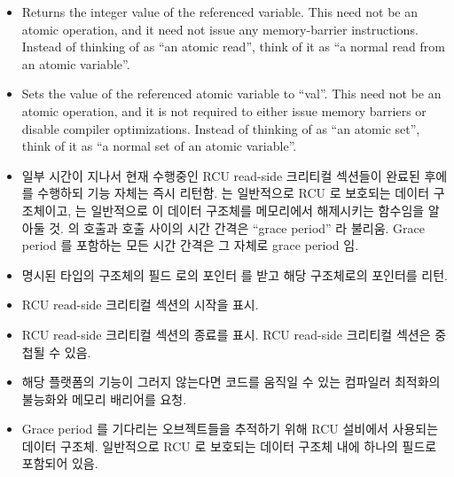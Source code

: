 \begin{itemize}
\item	{}
	Returns the integer value of the referenced variable.
	This need not be an atomic operation, and it need not issue any
	memory-barrier instructions.
	Instead of thinking of as ``an atomic read'', think of it as
	``a normal read from an atomic variable''.
\item	{}
	Sets the value of the referenced atomic variable to ``val''.
	This need not be an atomic operation, and it is not required
	to either issue memory
	barriers or disable compiler optimizations.
	Instead of thinking of as ``an atomic set'', think of it as
	``a normal set of an atomic variable''.
\fi
\item	{}
	일부 시간이 지나서 현재 수행중인 RCU read-side 크리티컬 섹션들이 완료된
	후에  를 수행하되  기능 자체는 즉시
	리턴함.
	 는 일반적으로 RCU 로 보호되는 데이터 구조체이고,  는
	일반적으로 이 데이터 구조체를 메모리에서 해제시키는 함수임을 알아둘 것.
	 의 호출과  호출 사이의 시간 간격은 ``grace
	period'' 라 불리움.
	Grace period 를 포함하는 모든 시간 간격은 그 자체로 grace period 임.
\item	{}
	명시된 타입의 구조체의 필드  로의 포인터  를 받고 해당
	구조체로의 포인터를 리턴.
\item	{}
	RCU read-side 크리티컬 섹션의 시작을 표시.
\item	{}
	RCU read-side 크리티컬 섹션의 종료를 표시.
	RCU read-side 크리티컬 섹션은 중첩될 수 있음.
\item	{}
	해당 플랫폼의  기능이 그러지 않는다면 코드를 움직일 수
	있는 컴파일러 최적화의 불능화와 메모리 배리어를 요청.
\item	{}
	Grace period 를 기다리는 오브젝트들을 추적하기 위해 RCU 설비에서
	사용되는 데이터 구조체.
	일반적으로 RCU 로 보호되는 데이터 구조체 내에 하나의 필드로 포함되어
	있음.
\iffalse


\end{itemize}
